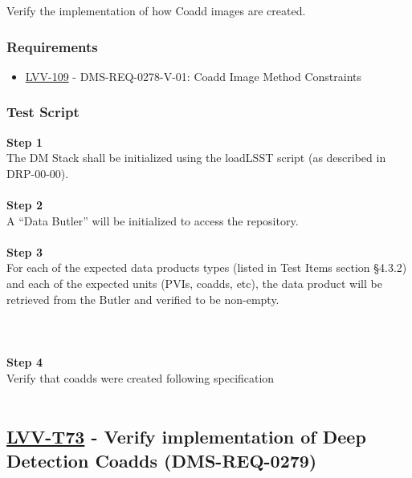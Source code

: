 Verify the implementation of how Coadd images are created.

\hypertarget{requirements-49}{%
\subsubsection{Requirements}\label{requirements-49}}

\begin{itemize}
\tightlist
\item
  \href{https://jira.lsstcorp.org/browse/LVV-109}{LVV-109} -
  DMS-REQ-0278-V-01: Coadd Image Method Constraints
\end{itemize}

\hypertarget{test-script-49}{%
\subsubsection{Test Script}\label{test-script-49}}

\textbf{Step 1}\\
The DM Stack shall be initialized using the loadLSST script (as
described in DRP-00-00).\\
~\\
\textbf{Step 2}\\
A ``Data Butler'' will be initialized to access the repository.\\
~\\
\textbf{Step 3}\\
For each of the expected data products types (listed in Test Items
section §4.3.2) and each of the expected units (PVIs, coadds, etc), the
data product will be retrieved from the Butler and verified to be
non-empty.\\
~\\
~\\
~\\
\textbf{Step 4}\\
Verify that coadds were created following specification\\
~\\

\hypertarget{lvv-t73---verify-implementation-of-deep-detection-coadds-dms-req-0279}{%
\subsection{\texorpdfstring{\href{https://jira.lsstcorp.org/secure/Tests.jspa\#/testCase/LVV-T73}{LVV-T73}
- Verify implementation of Deep Detection Coadds
(DMS-REQ-0279)}{LVV-T73 - Verify implementation of Deep Detection Coadds (DMS-REQ-0279)}}\label{lvv-t73---verify-implementation-of-deep-detection-coadds-dms-req-0279}}

